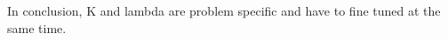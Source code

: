 \documentclass{scrartcl}
\begin{document}
In conclusion, K and lambda are problem specific and have to fine tuned at the same time.










%



\end{document}
